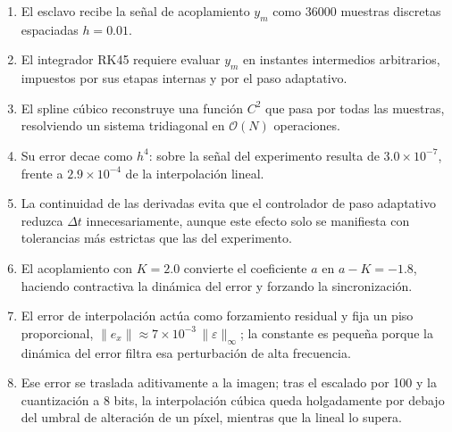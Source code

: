 \documentclass[12pt,a4paper]{article}
\begin{document}
\begin{enumerate}[leftmargin=1.4cm, itemsep=0.35em]
	\item El esclavo recibe la señal de acoplamiento $y_m$ como 36000 muestras discretas espaciadas $h = 0.01$.
	\item El integrador RK45 requiere evaluar $y_m$ en instantes intermedios arbitrarios, impuestos por sus etapas internas y por el paso adaptativo.
	\item El spline cúbico reconstruye una función $C^2$ que pasa por todas las muestras, resolviendo un sistema tridiagonal en $\mathcal{O}(N)$ operaciones.
	\item Su error decae como $h^4$: sobre la señal del experimento resulta de $3.0\times10^{-7}$, frente a $2.9\times10^{-4}$ de la interpolación lineal.
	\item La continuidad de las derivadas evita que el controlador de paso adaptativo reduzca $\Delta t$ innecesariamente, aunque este efecto solo se manifiesta con tolerancias más estrictas que las del experimento.
	\item El acoplamiento con $K = 2.0$ convierte el coeficiente $a$ en $a - K = -1.8$, haciendo contractiva la dinámica del error y forzando la sincronización.
	\item El error de interpolación actúa como forzamiento residual y fija un piso proporcional, $\|e_x\| \approx 7\times10^{-3}\,\|\varepsilon\|_{\infty}$; la constante es pequeña porque la dinámica del error filtra esa perturbación de alta frecuencia.
	\item Ese error se traslada aditivamente a la imagen; tras el escalado por 100 y la cuantización a 8 bits, la interpolación cúbica queda holgadamente por debajo del umbral de alteración de un píxel, mientras que la lineal lo supera.
\end{enumerate}
\end{document}
